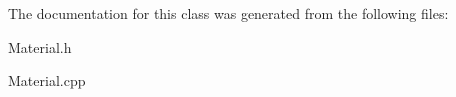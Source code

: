 The documentation for this class was generated from the following files\+:\begin{DoxyCompactItemize}
\item 
Material.\+h\item 
Material.\+cpp\end{DoxyCompactItemize}
